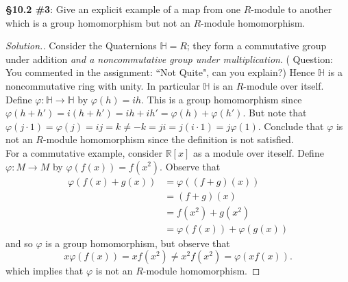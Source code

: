 \documentclass[8pt]{amsart}
\makeatletter
\theoremstyle{plain}%
\theoremstyle{definition}
\theoremstyle{remark}
\numberwithin{equation}{section}
\newenvironment{solution}
               {\let\oldqedsymbol=\qedsymbol%
                \def\@addpunct##1{}%
                \renewcommand{\qedsymbol}{$\blacktriangleleft$}%
                \begin{proof}[\itshape Solution.]}%
               {\end{proof}%
                \renewcommand{\qedsymbol}{\oldqedsymbol}}
\newcommand{\R}{\mathbb{R}}
\makeatother
\begin{document}
\textbf{\S 10.2 \#3}: Give an explicit example of a map from one $R$-module to another which is a group homomorphism but not an $R$-module homomorphism.
	\begin{solution}
		Consider the Quaternions $\mathbb H = R$; they form a commutative group under addition \textit{and a noncommutative group under multiplication}. ({ \color{green} Question: You commented in the assignment: ``Not Quite", can you explain?}) Hence $\mathbb H$ is a noncommutative ring with unity. In particular $\mathbb H$ is an $R$-module over itself. Define $\varphi : \mathbb H \to \mathbb H$ by $\varphi(h) = ih$. This is a group homomorphism since $\varphi(h + h') = i(h + h') = ih + ih' = \varphi(h) + \varphi(h')$. But note that $\varphi(j \cdot 1) = \varphi(j) = ij = k \neq -k = ji = j(i \cdot 1) = j \varphi(1)$. Conclude that $\varphi$ is not an $R$-module homomorphism since the definition is not satisfied.\\

		{\color{red} For a commutative example, consider $\R[x]$ as a module over iteself. Define $\varphi : M \to M$ by $\varphi(f(x)) = f(x^2)$. Observe that
		\begin{align*}
			\varphi(f(x) + g(x)) &= \varphi((f + g)(x))\\
			&= (f + g)(x)\\
			&= f(x^2) + g(x^2)\\
			&= \varphi(f(x)) + \varphi(g(x))
		\end{align*}
		and so $\varphi$ is a group homomorphism, but observe that $$x\varphi(f(x)) = xf(x^2) \neq x^2f(x^2) = \varphi(xf(x)).$$ which implies that $\varphi$ is not an $R$-module homomorphism.}
	\end{solution}
\end{document}
